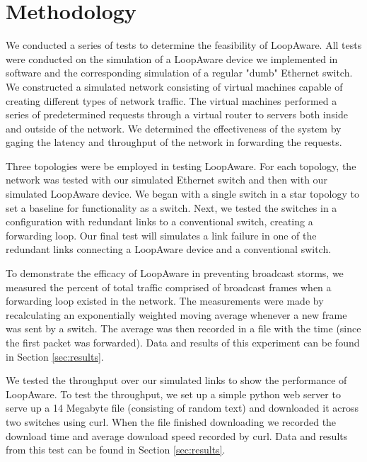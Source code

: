 \section{Methodology}
\label{sec:methodology}
    We conducted a series of tests to determine the feasibility of LoopAware.
    All tests were conducted on the simulation of a LoopAware device we implemented in software and the corresponding simulation of a regular "dumb" Ethernet switch.
    We constructed a simulated network consisting of virtual machines capable of creating different types of network traffic.
    The virtual machines performed a series of predetermined requests through a virtual router to servers both inside and outside of the network.
    We determined the effectiveness of the system by gaging the latency and throughput of the network in forwarding the requests.

    Three topologies were be employed in testing LoopAware.
    For each topology, the network was tested with our simulated Ethernet switch and then with our simulated LoopAware device.
    We began with a single switch in a star topology to set a baseline for functionality as a switch.
    Next, we tested the switches in a configuration with redundant links to a conventional switch, creating a forwarding loop.
    Our final test will simulates a link failure in one of the redundant links connecting a LoopAware device and a conventional switch.

    To demonstrate the efficacy of LoopAware in preventing broadcast storms, we measured the percent of total traffic comprised of broadcast frames when a forwarding loop existed in the network.
    The measurements were made by recalculating an exponentially weighted moving average whenever a new frame was sent by a switch.
    The average was then recorded in a file with the time (since the first packet was forwarded).
    Data and results of this experiment can be found in Section \ref{sec:results}.

    We tested the throughput over our simulated links to show the performance of LoopAware.
    To test the throughput, we set up a simple python web server to serve up a 14 Megabyte file (consisting of random text) and downloaded it across two switches using curl.
    When the file finished downloading we recorded the download time and average download speed recorded by curl.
    Data and results from this test can be found in Section \ref{sec:results}.

